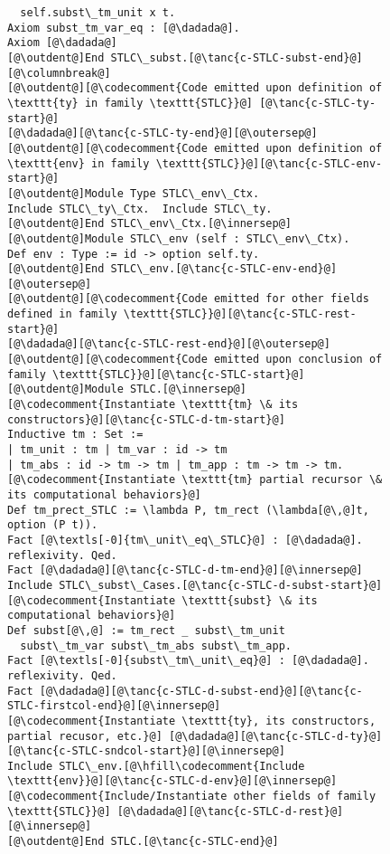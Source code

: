 \begin{figure}
\begin{minipage}{\textwidth}
\begin{multicols}{2}
\begin{lstlisting}
  self.subst\_tm_unit x t.
Axiom subst_tm_var_eq : [@\dadada@].
Axiom [@\dadada@]
[@\outdent@]End STLC\_subst.[@\tanc{c-STLC-subst-end}@][@\columnbreak@]
[@\outdent@][@\codecomment{Code emitted upon definition of \texttt{ty} in family \texttt{STLC}}@] [@\tanc{c-STLC-ty-start}@]
[@\dadada@][@\tanc{c-STLC-ty-end}@][@\outersep@]
[@\outdent@][@\codecomment{Code emitted upon definition of \texttt{env} in family \texttt{STLC}}@][@\tanc{c-STLC-env-start}@]
[@\outdent@]Module Type STLC\_env\_Ctx.
Include STLC\_ty\_Ctx.  Include STLC\_ty.
[@\outdent@]End STLC\_env\_Ctx.[@\innersep@]
[@\outdent@]Module STLC\_env (self : STLC\_env\_Ctx).
Def env : Type := id -> option self.ty.
[@\outdent@]End STLC\_env.[@\tanc{c-STLC-env-end}@][@\outersep@]
[@\outdent@][@\codecomment{Code emitted for other fields defined in family \texttt{STLC}}@][@\tanc{c-STLC-rest-start}@]
[@\dadada@][@\tanc{c-STLC-rest-end}@][@\outersep@]
[@\outdent@][@\codecomment{Code emitted upon conclusion of family \texttt{STLC}}@][@\tanc{c-STLC-start}@]
[@\outdent@]Module STLC.[@\innersep@]
[@\codecomment{Instantiate \texttt{tm} \& its constructors}@][@\tanc{c-STLC-d-tm-start}@]
Inductive tm : Set :=
| tm_unit : tm | tm_var : id -> tm
| tm_abs : id -> tm -> tm | tm_app : tm -> tm -> tm.
[@\codecomment{Instantiate \texttt{tm} partial recursor \& its computational behaviors}@]
Def tm_prect_STLC := \lambda P, tm_rect (\lambda[@\,@]t, option (P t)).
Fact [@\textls[-0]{tm\_unit\_eq\_STLC}@] : [@\dadada@]. reflexivity. Qed.
Fact [@\dadada@][@\tanc{c-STLC-d-tm-end}@][@\innersep@]
Include STLC\_subst\_Cases.[@\tanc{c-STLC-d-subst-start}@]
[@\codecomment{Instantiate \texttt{subst} \& its computational behaviors}@]
Def subst[@\,@] := tm_rect _ subst\_tm_unit
  subst\_tm_var subst\_tm_abs subst\_tm_app.
Fact [@\textls[-0]{subst\_tm\_unit\_eq}@] : [@\dadada@]. reflexivity. Qed.
Fact [@\dadada@][@\tanc{c-STLC-d-subst-end}@][@\tanc{c-STLC-firstcol-end}@][@\innersep@]
[@\codecomment{Instantiate \texttt{ty}, its constructors, partial recusor, etc.}@] [@\dadada@][@\tanc{c-STLC-d-ty}@][@\tanc{c-STLC-sndcol-start}@][@\innersep@]
Include STLC\_env.[@\hfill\codecomment{Include \texttt{env}}@][@\tanc{c-STLC-d-env}@][@\innersep@]
[@\codecomment{Include/Instantiate other fields of family \texttt{STLC}}@] [@\dadada@][@\tanc{c-STLC-d-rest}@][@\innersep@]
[@\outdent@]End STLC.[@\tanc{c-STLC-end}@]
\end{lstlisting}


\end{multicols}
\end{minipage}
\end{figure}
